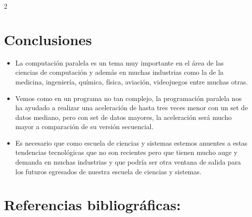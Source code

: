 \documentclass[12pt,spanish,Letterpaper,openany]{book}
\begin{document}
\begin {multicols}{2}
\hypertarget{conclusiones-3}{%
\section{Conclusiones}\label{conclusiones-3}}

\begin{itemize}
\item
  La computación paralela es un tema muy importante en el área de las ciencias de computación y además en muchas industrias como la de la medicina, ingeniería, química, física, aviación, videojuegos entre muchas otras.
\item
  Vemos como en un programa no tan complejo, la programación paralela nos ha ayudado a realizar una aceleración de hasta tres veces menor con un set de datos mediano, pero con set de datos mayores, la aceleración será mucho mayor a comparación de su versión secuencial.
\item
  Es necesario que como escuela de ciencias y sistemas estemos anuentes a estas tendencias tecnológicas que no son recientes pero que tienen mucho auge y demanda en muchas industrias y que podría ser otra ventana de salida para los futuros egresados de nuestra escuela de ciencias y sistemas.
\end{itemize}

\hypertarget{referencias-bibliograficas-3}{%
\section{Referencias bibliográficas:}\label{referencias-bibliograficas-3}}


\end{multicols}
\end{document}
